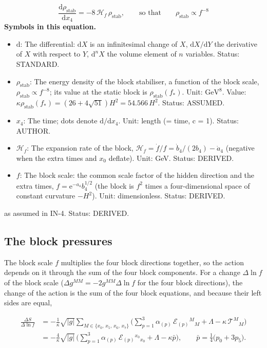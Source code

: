 \documentclass[
  10pt,
]{article}
\providecommand{\tightlist}{%
  \setlength{\itemsep}{0pt}\setlength{\parskip}{0pt}}
\begin{document}
\[
\frac{\mathrm{d}\rho_{\mathrm{stab}}}{\mathrm{d}x_4} = -8\,\mathcal{H}_f\,\rho_{\mathrm{stab}},\qquad\text{so that}\qquad \rho_{\mathrm{stab}} \propto f^{-8}
\] \textbf{Symbols in this equation.}

\begin{itemize}
\tightlist
\item
  \(\mathrm{d}\): The differential: \(\mathrm{d}X\) is an infinitesimal
  change of \(X\), \(\mathrm{d}X/\mathrm{d}Y\) the derivative of \(X\)
  with respect to \(Y\), \(\mathrm{d}^nX\) the volume element of \(n\)
  variables. Status: STANDARD.
\item
  \(\rho_{\mathrm{stab}}\): The energy density of the block stabiliser,
  a function of the block scale,
  \(\rho_{\mathrm{stab}} \propto f^{-8}\); its value at the static block
  is \(\rho_{\mathrm{stab}}(f_*)\). Unit: \(\mathrm{GeV}^{8}\). Value:
  \(\kappa\rho_{\mathrm{stab}}(f_*) = (26 + 4\sqrt{51})H^2 = 54.566\,H^2\).
  Status: ASSUMED.
\item
  \(x_4\): The time; dots denote \(\mathrm{d}/\mathrm{d}x_4\). Unit:
  length (= time, c = 1). Status: AUTHOR.
\item
  \(\mathcal{H}_f\): The expansion rate of the block,
  \(\mathcal{H}_f = \dot f/f = \dot b_4/(2b_4) - \dot a_4\) (negative
  when the extra times and \(x_0\) deflate). Unit: GeV. Status: DERIVED.
\item
  \(f\): The block scale: the common scale factor of the hidden
  direction and the extra times, \(f = \mathrm{e}^{-a_4}b_4^{1/2}\) (the
  block is \(f^2\) times a four-dimensional space of constant curvature
  \(-H^2\)). Unit: dimensionless. Status: DERIVED.
\end{itemize}

as assumed in IN-4. Status: DERIVED.

\hypertarget{the-block-pressures}{%
\subsection{The block pressures}\label{the-block-pressures}}

The block scale \(f\) multiplies the four block directions together, so
the action depends on it through the sum of the four block components.
For a change \(\Delta\ln f\) of the block scale
(\(\Delta g^{MM} = -2g^{MM}\Delta\ln f\) for the four block directions),
the change of the action is the sum of the four block equations, and
because their left sides are equal,

\[
\begin{aligned}
\frac{\Delta S}{\Delta\ln f} &= -\frac{1}{\kappa}\sqrt{\lvert g\rvert}\sum_{M\in\{x_0,\,x_5,\,x_6,\,x_7\}}
 \Big(\sum_{p=1}^{3}\alpha_{(p)}\,\mathcal{E}_{(p)}{}^M{}_M + \Lambda - \kappa\,\mathcal{T}^M{}_M\Big)\\
 &= -\frac{4}{\kappa}\sqrt{\lvert g\rvert}\,\Big(\sum_{p=1}^{3}\alpha_{(p)}\,\mathcal{E}_{(p)}{}^{x_0}{}_{x_0} + \Lambda -
 \kappa\bar p\Big),\qquad \bar p = \tfrac14\big(p_0 + 3p_5\big).
\end{aligned}
\]
\end{document}
